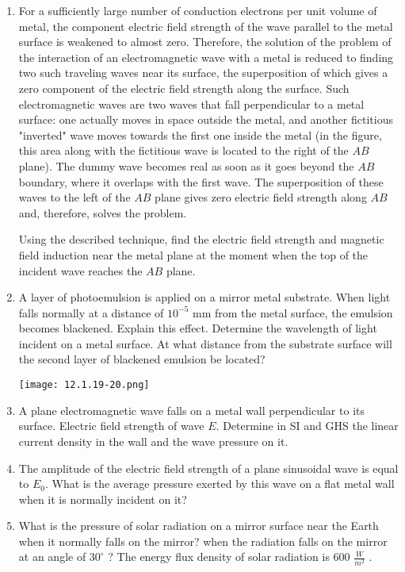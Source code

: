 \documentclass{article}
\begin{document}
\begin{enumerate}[label=12.1.\arabic*]
\item For a sufficiently large number of conduction electrons per unit volume of metal, the component electric field strength of the wave parallel to the metal surface is weakened to almost zero. Therefore, the solution of the problem of the interaction of an electromagnetic wave with a metal is reduced to finding two such traveling waves near its surface, the superposition of which gives a zero component of the electric field strength along the surface. Such electromagnetic waves are two waves that fall perpendicular to a metal surface: one actually moves in space outside the metal, and another fictitious "inverted" wave moves towards the first one inside the metal (in the figure, this area along with the fictitious wave is located to the right of the $AB$ plane). The dummy wave becomes real as soon as it goes beyond the $AB$ boundary, where it overlaps with the first wave. The superposition of these waves to the left of the $AB$ plane gives zero electric field strength along $AB$ and, therefore, solves the problem.

Using the described technique, find the electric field strength and magnetic field induction near the metal plane at the moment when the top of the incident wave reaches the $AB$ plane.

\item A layer of photoemulsion is applied on a mirror metal substrate. When light falls normally at a distance of $10^{-5}$ mm from the metal surface, the emulsion becomes blackened. Explain this effect. Determine the wavelength of light incident on a metal surface. At what distance from the substrate surface will the second layer of blackened emulsion be located?

\begin{center}
    \texttt{[image: 12.1.19-20.png]}
\end{center}


\item A plane electromagnetic wave falls on a metal wall perpendicular to its surface. Electric field strength of wave $E$. Determine in SI and GHS the linear current density in the wall and the wave pressure on it.

\item The amplitude of the electric field strength of a plane sinusoidal wave is equal to $E_0$. What is the average pressure exerted by this wave on a flat metal wall when it is normally incident on it?

\item What is the pressure of solar radiation on a mirror surface near the Earth when it normally falls on the mirror? when the radiation falls on the mirror at an angle of $30^\circ$ ? The energy flux density of solar radiation is $600$ $\frac{W}{m^2}$ .


\end{enumerate}
\end{document}
